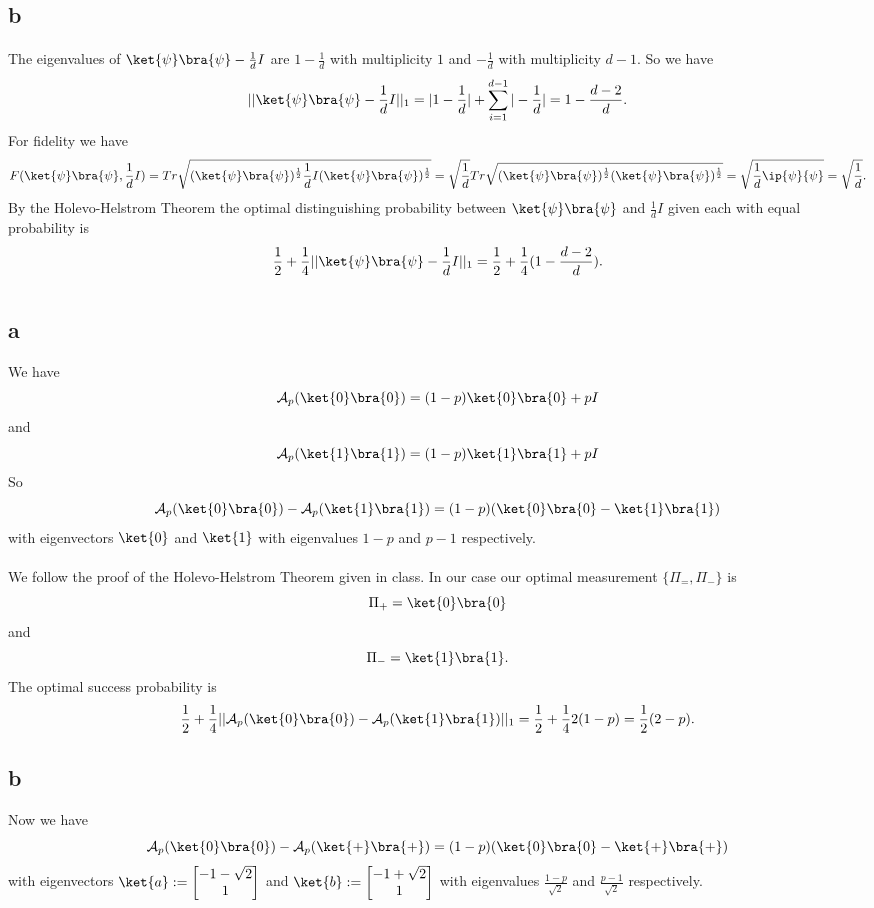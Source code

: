 \documentclass[letterpaper,12pt,oneside,onecolumn]{article}
\newcommand{\cA}{\mathcal{A}} \newcommand{\cB}{\mathcal{B}}
\begin{document}
\subsection{b}
\paragraph{}
The eigenvalues of $\ket{\psi}\bra{\psi} - \frac{1}{d}I$ are $1-\frac{1}{d}$ with multiplicity $1$ and $-\frac{1}{d}$ with multiplicity $d-1$.
So we have $$||\ket{\psi}\bra{\psi} - \frac{1}{d}I ||_1 = |1-\frac{1}{d}| + \sum_{i=1}^{d-1} |-\frac{1}{d}| =1 - \frac{d-2}{d}.$$
For fidelity we have
$$F(\ket{\psi}\bra{\psi}, \frac{1}{d}I) = Tr\sqrt{(\ket{\psi}\bra{\psi})^\frac{1}{2}\frac{1}{d}I (\ket{\psi}\bra{\psi})^\frac{1}{2} } = \sqrt{\frac{1}{d}}Tr\sqrt{(\ket{\psi}\bra{\psi})^\frac{1}{2}(\ket{\psi}\bra{\psi})^\frac{1}{2}} = \sqrt{\frac{1}{d}\ip{\psi}{\psi}} = \sqrt{\frac{1}{d}}.$$
By the Holevo-Helstrom Theorem the optimal distinguishing probability between $\ket{\psi}\bra{\psi}$ and $\frac{1}{d}I$ given each with equal probability is
$$\frac{1}{2} + \frac{1}{4}||\ket{\psi}\bra{\psi} - \frac{1}{d}I ||_1 = \frac{1}{2} + \frac{1}{4}(1 - \frac{d-2}{d}).$$
\section{}
\subsection{a}
We have
$$\cA_p(\ket{0}\bra{0}) = (1-p)\ket{0}\bra{0} + pI$$
and
$$\cA_p(\ket{1}\bra{1}) = (1-p)\ket{1}\bra{1} + pI$$
So
$$\cA_p(\ket{0}\bra{0}) - \cA_p(\ket{1}\bra{1})  = (1-p)(\ket{0}\bra{0} - \ket{1}\bra{1})$$
with eigenvectors $\ket{0}$ and $\ket{1}$ with eigenvalues $1-p$ and $p-1$ respectively.
\paragraph{}
We follow the proof of the Holevo-Helstrom Theorem given in class. In our case our optimal measurement $\{\Pi_=, \Pi_-\}$ is
$$\Pi_+ = \ket{0}\bra{0}$$
and
$$\Pi_- = \ket{1}\bra{1}.$$
The optimal success probability is
$$\frac{1}{2} + \frac{1}{4}||\cA_p(\ket{0}\bra{0}) - \cA_p(\ket{1}\bra{1})||_1 = \frac{1}{2} + \frac{1}{4}2(1-p) = \frac{1}{2} (2-p).$$
\subsection{b}
Now we have
$$\cA_p(\ket{0}\bra{0}) - \cA_p(\ket{+}\bra{+}) = (1-p)(\ket{0}\bra{0} - \ket{+}\bra{+})$$
with eigenvectors $\ket{a} := \begin{bmatrix} -1-\sqrt{2} \\ 1\end{bmatrix}$ and $\ket{b} :=\begin{bmatrix} -1 + \sqrt{2} \\ 1 \end{bmatrix}$ with eigenvalues $\frac{1-p}{\sqrt{2}}$ and $\frac{p-1}{\sqrt{2}}$ respectively.
\end{document}
